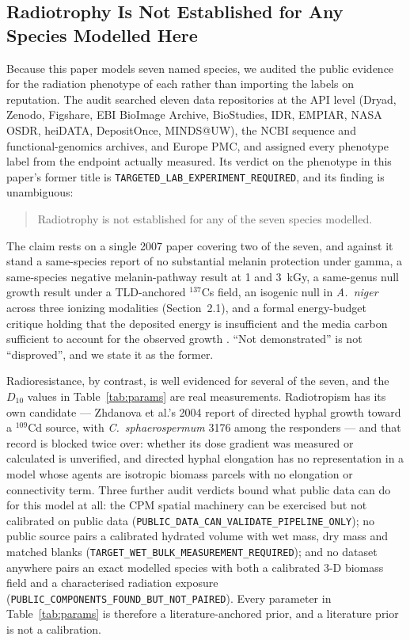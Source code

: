 \documentclass[11pt]{article}
\begin{document}
\subsection{Radiotrophy Is Not Established for Any Species Modelled Here}
\label{sec:radiotrophy_status}

Because this paper models seven named species, we audited the public evidence for the radiation
phenotype of each rather than importing the labels on reputation. The audit
\cite{audit2026} searched eleven data repositories at the API level (Dryad, Zenodo, Figshare, EBI
BioImage Archive, BioStudies, IDR, EMPIAR, NASA OSDR, heiDATA, DepositOnce, MINDS@UW), the NCBI
sequence and functional-genomics archives, and Europe PMC, and assigned every phenotype label from
the endpoint actually measured. Its verdict on the phenotype in this paper's former title is
\texttt{TARGETED\_LAB\_EXPERIMENT\_REQUIRED}, and its finding is unambiguous:

\begin{quote}
Radiotrophy is not established for any of the seven species modelled.
\end{quote}

The claim rests on a single 2007 paper covering two of the seven, and against it stand a
same-species report of no substantial melanin protection under gamma, a same-species negative
melanin-pathway result at 1 and 3~kGy, a same-genus null growth result under a TLD-anchored
$^{137}$Cs field, an isogenic null in \textit{A.\ niger} across three ionizing modalities
(Section~2.1), and a formal energy-budget critique holding that the deposited energy is
insufficient and the media carbon sufficient to account for the observed growth
\cite{walberg2015}. ``Not demonstrated'' is not ``disproved'', and we state it as the former.

Radioresistance, by contrast, is well evidenced for several of the seven, and the
$D_{10}$ values in Table~\ref{tab:params} are real measurements. Radiotropism has its own
candidate --- Zhdanova et al.'s 2004 report of directed hyphal growth toward a $^{109}$Cd source,
with \textit{C.\ sphaerospermum} 3176 among the responders --- and that record is blocked twice
over: whether its dose gradient was measured or calculated is unverified, and directed hyphal
elongation has no representation in a model whose agents are isotropic biomass parcels with no
elongation or connectivity term. Three further audit verdicts bound what public data can do for
this model at all: the CPM spatial machinery can be exercised but not calibrated on public data
(\texttt{PUBLIC\_DATA\_CAN\_VALIDATE\_PIPELINE\_ONLY}); no public source pairs a calibrated
hydrated volume with wet mass, dry mass and matched blanks
(\texttt{TARGET\_WET\_BULK\_MEASUREMENT\_REQUIRED}); and no dataset anywhere pairs an exact
modelled species with both a calibrated 3-D biomass field and a characterised radiation exposure
(\texttt{PUBLIC\_COMPONENTS\_FOUND\_BUT\_NOT\_PAIRED}). Every parameter in Table~\ref{tab:params}
is therefore a literature-anchored prior, and a literature prior is not a calibration.
\end{document}
